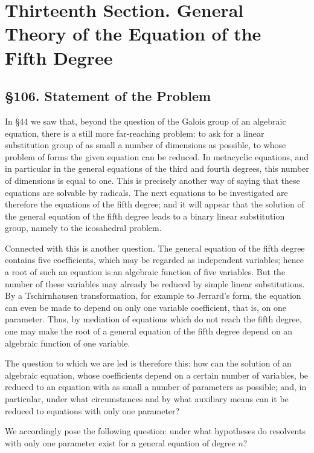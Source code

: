 \documentclass[11pt,a4paper]{book}
\newcommand{\webersection}[2]{\clearpage\section*{\S #1. #2}}
\newcommand{\booktitle}[1]{\clearpage\chapter*{#1}}
\begin{document}
\newpage

\booktitle{Thirteenth Section. General Theory of the Equation of the Fifth Degree}

\webersection{106}{Statement of the Problem}

In \S 44 we saw that, beyond the question of the Galois group of an algebraic equation, there is a still more far-reaching problem: to ask for a linear substitution group of as small a number of dimensions as possible, to whose problem of forms the given equation can be reduced.  In metacyclic equations, and in particular in the general equations of the third and fourth degrees, this number of dimensions is equal to one.  This is precisely another way of saying that these equations are solvable by radicals.  The next equations to be investigated are therefore the equations of the fifth degree; and it will appear that the solution of the general equation of the fifth degree leads to a binary linear substitution group, namely to the icosahedral problem.

Connected with this is another question.  The general equation of the fifth degree contains five coefficients, which may be regarded as independent variables; hence a root of such an equation is an algebraic function of five variables.  But the number of these variables may already be reduced by simple linear substitutions.  By a Tschirnhausen transformation, for example to Jerrard's form, the equation can even be made to depend on only one variable coefficient, that is, on one parameter.  Thus, by mediation of equations which do not reach the fifth degree, one may make the root of a general equation of the fifth degree depend on an algebraic function of one variable.

The question to which we are led is therefore this: how can the solution of an algebraic equation, whose coefficients depend on a certain number of variables, be reduced to an equation with as small a number of parameters as possible; and, in particular, under what circumstances and by what auxiliary means can it be reduced to equations with only one parameter?

We accordingly pose the following question: under what hypotheses do resolvents with only one parameter exist for a general equation of degree $n$?
\end{document}
